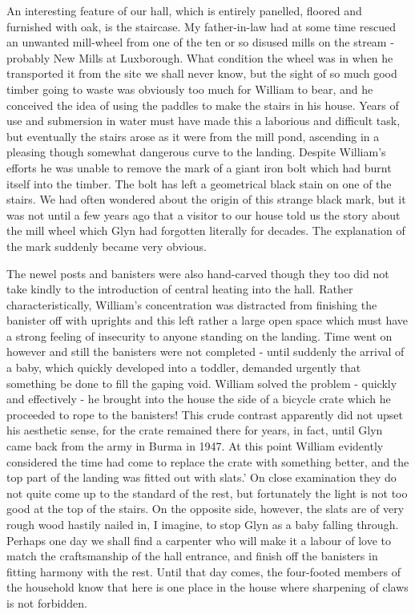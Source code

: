 An interesting feature of our hall, which is entirely panelled, floored and furnished with oak, is the staircase. My father-in-law had at some time rescued an unwanted mill-wheel from one of the ten or so disused mills on the stream - probably New Mills at Luxborough. What condition the wheel was in when he transported it from the site we shall never know, but the sight of so much good timber going to waste was obviously too much for William to bear, and he conceived the idea of using the paddles to make the stairs in his house. Years of use and submersion in water must have made this a laborious and difficult task, but eventually the stairs arose as it were from the mill pond, ascending in a pleasing though somewhat dangerous curve to the landing. Despite William's efforts he was unable to remove the mark of a giant iron bolt which had burnt itself into the timber. The bolt has left a geometrical black stain on one of the stairs. We had often wondered about the origin of this strange black mark, but it was not until a few years ago that a visitor to our house told us the story about the mill wheel which Glyn had forgotten literally for decades. The explanation of the mark suddenly became very obvious.

The newel posts and banisters were also hand-carved though they too did not take kindly to the introduction of central heating into the hall. Rather characteristically, William's concentration was distracted from finishing the banister off with uprights and this left rather a large open space which must have a strong feeling of insecurity to anyone standing on the landing. Time went on however and still the banisters were not completed - until suddenly the arrival of a baby, which quickly developed into a toddler, demanded urgently that something be done to fill the gaping void. William solved the problem - quickly and effectively - he brought into the house the side of a bicycle crate which he proceeded to rope to the banisters! This crude contrast apparently did not upset his aesthetic sense, for the crate remained there for years, in fact, until Glyn came back from the army in Burma in 1947. At this point William evidently considered the time had come to replace the crate with something better, and the top part of the landing was fitted out with slats.' On close examination they do not quite come up to the standard of the rest, but fortunately the light is not too good at the top of the stairs. On the opposite side, however, the slats are of very rough wood hastily nailed in, I imagine, to stop Glyn as a baby falling through. Perhaps one day we shall find a carpenter who will make it a labour of love to match the craftsmanship of the hall entrance, and finish off the banisters in fitting harmony with the rest. Until that day comes, the four-footed members of the household know that here is one place in the house where sharpening of claws is not forbidden.

